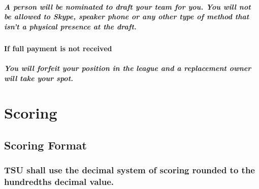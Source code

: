 \documentclass[
]{book}
\begin{document}
\hypertarget{a-person-will-be-nominated-to-draft-your-team-for-you.-you-will-not-be-allowed-to-skype-speaker-phone-or-any-other-type-of-method-that-isnt-a-physical-presence-at-the-draft.}{%
\paragraph{A person will be nominated to draft your team for you. You will not be allowed to Skype, speaker phone or any other type of method that isn't a physical presence at the draft.}\label{a-person-will-be-nominated-to-draft-your-team-for-you.-you-will-not-be-allowed-to-skype-speaker-phone-or-any-other-type-of-method-that-isnt-a-physical-presence-at-the-draft.}}

\hypertarget{if-full-payment-is-not-received}{%
\subsubsection{If full payment is not received}\label{if-full-payment-is-not-received}}

\hypertarget{you-will-forfeit-your-position-in-the-league-and-a-replacement-owner-will-take-your-spot.}{%
\paragraph{You will forfeit your position in the league and a replacement owner will take your spot.}\label{you-will-forfeit-your-position-in-the-league-and-a-replacement-owner-will-take-your-spot.}}

\hypertarget{scoring}{%
\chapter{Scoring}\label{scoring}}

\hypertarget{scoring-format}{%
\section{Scoring Format}\label{scoring-format}}

\hypertarget{tsu-shall-use-the-decimal-system-of-scoring-rounded-to-the-hundredths-decimal-value.}{%
\subsection{TSU shall use the decimal system of scoring rounded to the hundredths decimal value.}\label{tsu-shall-use-the-decimal-system-of-scoring-rounded-to-the-hundredths-decimal-value.}}
\end{document}
